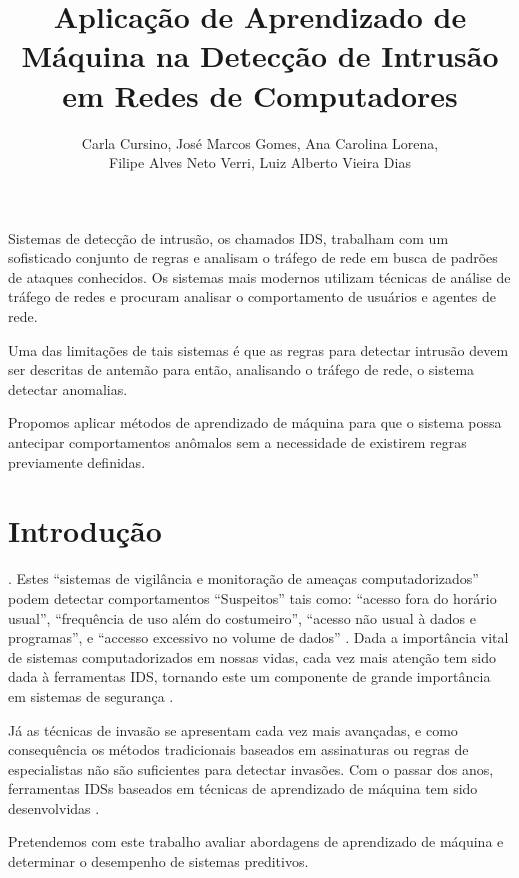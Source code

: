 \documentclass[twoside]{article}
\title{Aplicação de Aprendizado de Máquina na Detecção de Intrusão em Redes de Computadores}
\author{
    Carla Cursino\inst{1}\orcidIcon{0000-0002-7718-5897},
    José Marcos Gomes\inst{1}\orcidIcon{0000-0001-9223-7512},
    Ana Carolina Lorena\inst{1}\orcidIcon{0000-0002-6140-571X}, \\
    Filipe Alves Neto Verri\inst{1}\orcidIcon{0000-0002-8240-5129},
    Luiz Alberto Vieira Dias\inst{1}\orcidIcon{0000-0001-5958-8011}
}
\begin{document}
 

\maketitle

\begin{resumo}\footnotesize
    Sistemas de detecção de intrusão, os chamados \gls{IDS}, trabalham com um sofisticado conjunto de regras e analisam o tráfego de rede em busca de padrões de ataques conhecidos. Os sistemas mais modernos utilizam técnicas de análise de tráfego de redes e procuram analisar o comportamento de usuários e agentes de rede.

    Uma das limitações de tais sistemas é que as regras para detectar intrusão devem ser descritas de antemão para então, analisando o tráfego de rede, o sistema detectar anomalias.
    
    Propomos aplicar métodos de aprendizado de máquina para que o sistema possa antecipar comportamentos anômalos sem a necessidade de existirem regras previamente definidas.
\end{resumo}\normalsize

\section{Introdução}

. Estes ``sistemas de vigilância e monitoração de ameaças computadorizados'' podem detectar comportamentos ``Suspeitos'' tais como: ``acesso fora do horário usual'', ``frequência de uso além do costumeiro'', ``acesso não usual à dados e programas'', e ``accesso excessivo no volume de dados'' \cite{anderson1980computer}. Dada a importância vital de sistemas computadorizados em nossas vidas, cada vez mais atenção tem sido dada à ferramentas \gls{IDS}, tornando este um componente de grande importância em sistemas de segurança \cite{milenkoski2015evaluating}.

Já as técnicas de invasão se apresentam cada vez mais avançadas, e como consequência os métodos tradicionais baseados em assinaturas ou regras de especialistas não são suficientes \cite{radford2018network} para detectar invasões. Com o passar dos anos, ferramentas \glspl{IDS} baseados em técnicas de aprendizado de máquina tem sido desenvolvidas \cite{milenkoski2015evaluating}.

Pretendemos com este trabalho avaliar abordagens de aprendizado de máquina e determinar o desempenho de sistemas preditivos.
\end{document}
